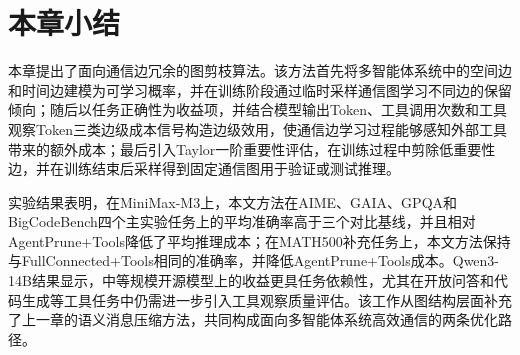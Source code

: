 \section{本章小结}

本章提出了面向通信边冗余的图剪枝算法。该方法首先将多智能体系统中的空间边和时间边建模为可学习概率，并在训练阶段通过临时采样通信图学习不同边的保留倾向；随后以任务正确性为收益项，并结合模型输出Token、工具调用次数和工具观察Token三类边级成本信号构造边级效用，使通信边学习过程能够感知外部工具带来的额外成本；最后引入Taylor一阶重要性评估，在训练过程中剪除低重要性边，并在训练结束后采样得到固定通信图用于验证或测试推理。

实验结果表明，在MiniMax-M3上，本文方法在AIME、GAIA、GPQA和BigCodeBench四个主实验任务上的平均准确率高于三个对比基线，并且相对AgentPrune+Tools降低了平均推理成本；在MATH500补充任务上，本文方法保持与FullConnected+Tools相同的准确率，并降低AgentPrune+Tools成本。Qwen3-14B结果显示，中等规模开源模型上的收益更具任务依赖性，尤其在开放问答和代码生成等工具任务中仍需进一步引入工具观察质量评估。该工作从图结构层面补充了上一章的语义消息压缩方法，共同构成面向多智能体系统高效通信的两条优化路径。
